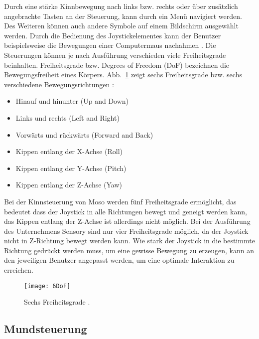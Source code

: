 \newline \newline
Durch eine stärke Kinnbewegung nach links bzw. rechts oder über zusätzlich angebrachte Tasten an der Steuerung, kann durch ein Menü navigiert werden. Des Weiteren können auch andere Symbole auf einem Bildschirm ausgewählt werden. Durch die Bedienung des Joystickelementes kann der Benutzer beispielsweise die Bewegungen einer Computermaus nachahmen \cite{MOSO} \cite{SENSORY}. 
\newline \newline
Die Steuerungen können je nach Ausführung verschieden viele Freiheitsgrade beinhalten. Freiheitsgrade bzw. Degrees of Freedom (DoF) bezeichnen die Bewegungsfreiheit eines Körpers.
\newline \newline
Abb.~\ref{fig:6DoF} zeigt sechs Freiheitsgrade bzw. sechs verschiedene Bewegungsrichtungen \cite{6DoF}:
\begin{itemize}
      \item Hinauf und hinunter (Up and Down)
      \item Links und rechts (Left and Right)
			\item Vorwärts und rückwärts (Forward and Back)
			\item Kippen entlang der X-Achse (Roll)
      \item Kippen entlang der Y-Achse (Pitch)
			\item Kippen entlang der Z-Achse (Yaw)
\end{itemize}
%
\vspace{\baselineskip}
Bei der Kinnsteuerung von Moso werden fünf Freiheitsgrade ermöglicht, das bedeutet dass der Joystick in alle Richtungen bewegt und geneigt werden kann, das Kippen entlang der Z-Achse ist allerdings nicht möglich. Bei der Ausführung des Unternehmens Sensory sind nur vier Freiheitsgrade möglich, da der Joystick nicht in Z-Richtung bewegt werden kann. 
Wie stark der Joystick in die bestimmte Richtung gedrückt werden muss, um eine gewisse Bewegung zu erzeugen, kann an den jeweiligen Benutzer angepasst werden, um eine optimale Interaktion zu erreichen.
%
\begin{figure}
\centering
\texttt{[image: 6DoF]}
\caption{Sechs Freiheitsgrade \cite{6DoFPic}.}
\label{fig:6DoF}
\end{figure}
%
%

\subsection{Mundsteuerung}

